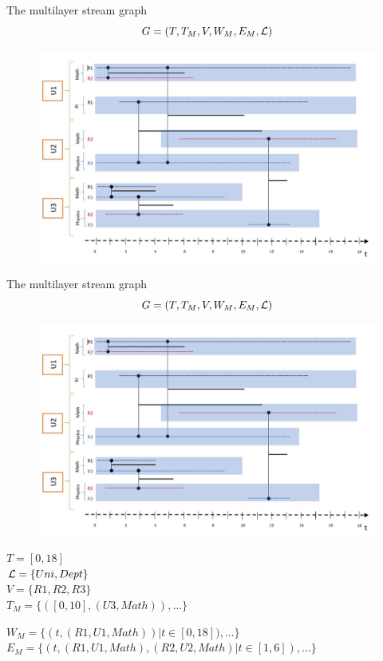 \documentclass[15pt]{beamer}
\begin{document}
\begin{frame}{The multilayer stream graph}
\[
G=(T,T_M,V,W_M,E_M,\cal{L})
\]

\begin{figure}
    \centering
    \includegraphics[width=\linewidth]{img/chercheurs.jpg}
\end{figure}
\end{frame}
\begin{frame}{The multilayer stream graph}
	\[
		G=(T,T_M,V,W_M,E_M,\cal{L})
	\]
	\begin{minipage}{0.59\linewidth}
		\begin{figure}
    		\centering
    		\includegraphics[width=\linewidth]{img/chercheurs.jpg}
		\end{figure}
	\end{minipage}
	\begin{minipage}{0.4\textwidth}
		\begin{footnotesize}
			$T=[0,18]$\\ \pause
			${\cal L} = \{Uni,Dept\}$\\ \pause
			$V=\{R1,R2,R3\}$\\ \pause
			$T_M= \{([0,10],(U3,Math)), \dots \}$\pause
		\end{footnotesize}
	\end{minipage}

	\begin{footnotesize}
		$W_M = \{ (t,(R1,U1,Math))| t \in [0,18]), \dots \}$ \pause
		\\
		$E_M= \{ (t,(R1,U1,Math),(R2,U2,Math)| t \in [1,6]), \dots \}$ 	
	\end{footnotesize}
\end{frame}
\end{document}
